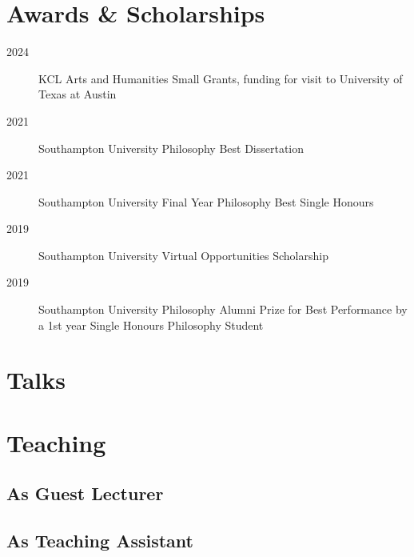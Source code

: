 \documentclass{cv}
\begin{document}
\section*{Awards \& Scholarships}
\begin{description}
\item[{2024}] KCL Arts and Humanities Small Grants, funding for visit to
  University of Texas at Austin
\item[{2021}] Southampton University Philosophy Best Dissertation
\item[{2021}] Southampton University Final Year Philosophy Best Single
  Honours
\item[{2019}] Southampton University Virtual Opportunities Scholarship
\item[{2019}] Southampton University Philosophy Alumni Prize for Best
  Performance by a 1st year Single Honours Philosophy Student
\end{description}

\section*{Talks }
\printbibliography[check=Presentation]{}

\section*{Teaching}
\subsection*{As Guest Lecturer}
\printbibliography[env=teaching,check=Teaching+GuestLecturer]{}

\subsection*{As Teaching Assistant}
\printbibliography[env=teaching,check=Teaching+TA]{}
\end{document}
